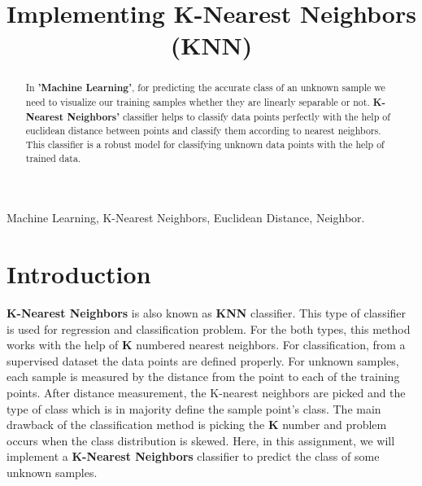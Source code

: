 \documentclass[conference]{IEEEtran}
\begin{document}
\title{Implementing K-Nearest Neighbors (KNN)\\
}

\author{

}

\maketitle

\begin{abstract}
In \textbf{'Machine Learning'}, for predicting the accurate class of an unknown sample we need to visualize our training samples whether they are linearly separable or not. \textbf{K-Nearest Neighbors'} classifier helps to classify data points perfectly with the help of euclidean distance between points and classify them according to nearest neighbors. This classifier is a robust model for classifying unknown data points with the help of trained data.
\end{abstract}

\begin{IEEEkeywords}
Machine Learning, K-Nearest Neighbors, Euclidean Distance, Neighbor.
\end{IEEEkeywords}

\section{Introduction}
\textbf{K-Nearest Neighbors} is also known as \textbf{KNN} classifier. This type of classifier is used for regression and classification problem. For the both types, this method works with the help of \textbf{K} numbered nearest neighbors. For classification, from a supervised dataset the data points are defined properly. For unknown samples, each sample is measured by the distance from the point to each of the training points. After distance measurement, the K-nearest neighbors are picked and the type of class which is in majority define the sample point's class. The main drawback of the classification method is picking the \textbf{K} number and problem occurs when the class distribution is skewed. Here, in this assignment, we will implement a \textbf{K-Nearest Neighbors} classifier to predict the class of some unknown samples.
\end{document}
